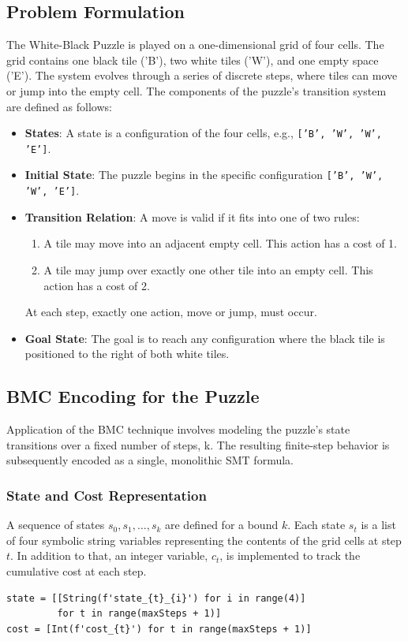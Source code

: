 \documentclass[12pt, a4paper, oneside]{report} %
\begin{document}
\subsection{Problem Formulation}

The White-Black Puzzle is played on a one-dimensional grid of four cells. The grid contains one black tile ('B'), two white tiles ('W'), and one empty space ('E'). The system evolves through a series of discrete steps, where tiles can move or jump into the empty cell. The components of the puzzle's transition system are defined as follows:
\begin{itemize}
    \item \textbf{States}: A state is a configuration of the four cells, e.g., \texttt{['B', 'W', 'W', 'E']}.
    \item \textbf{Initial State}: The puzzle begins in the specific configuration \texttt{['B', 'W', 'W', 'E']}.
    \item \textbf{Transition Relation}: A move is valid if it fits into one of two rules:
    \begin{enumerate}
        \item A tile may move into an adjacent empty cell. This action has a cost of 1.
        \item A tile may jump over exactly one other tile into an empty cell. This action has a cost of 2.
    \end{enumerate}
    At each step, exactly one action, move or jump, must occur.
    \item \textbf{Goal State}: The goal is to reach any configuration where the black tile is positioned to the right of both white tiles.
\end{itemize}

\subsection{BMC Encoding for the Puzzle}
Application of the BMC technique involves modeling the puzzle's state transitions over a fixed number of steps, k. The resulting finite-step behavior is subsequently encoded as a single, monolithic SMT formula.
\subsubsection{State and Cost Representation}
A sequence of states $s_0, s_1, \dots, s_k$ are defined for a bound $k$. Each state $s_t$ is a list of four symbolic string variables representing the contents of the grid cells at step $t$. In addition to that,  an integer variable, $c_t$, is implemented to track the cumulative cost at each step.
\begin{verbatim}
state = [[String(f'state_{t}_{i}') for i in range(4)] 
         for t in range(maxSteps + 1)]
cost = [Int(f'cost_{t}') for t in range(maxSteps + 1)]
\end{verbatim}
\end{document}
